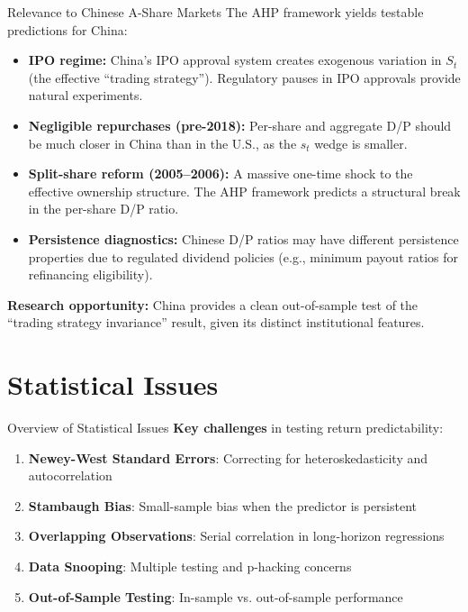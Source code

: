 \documentclass{beamer}
\begin{document}
\begin{frame}{Relevance to Chinese A-Share Markets}
	The AHP framework yields testable predictions for China:
	\begin{itemize}
		\item \textbf{IPO regime:} China's IPO approval system creates exogenous variation in $S_t$ (the effective ``trading strategy''). Regulatory pauses in IPO approvals provide natural experiments.
		\item \textbf{Negligible repurchases (pre-2018):} Per-share and aggregate D/P should be much closer in China than in the U.S., as the $s_t$ wedge is smaller.
		\item \textbf{Split-share reform (2005--2006):} A massive one-time shock to the effective ownership structure. The AHP framework predicts a structural break in the per-share D/P ratio.
		\item \textbf{Persistence diagnostics:} Chinese D/P ratios may have different persistence properties due to regulated dividend policies (e.g., minimum payout ratios for refinancing eligibility).
	\end{itemize}
	
	\vspace{5pt}
	\textbf{Research opportunity:} China provides a clean out-of-sample test of the ``trading strategy invariance'' result, given its distinct institutional features.
\end{frame}

\section{Statistical Issues}

\begin{frame}{Overview of Statistical Issues}
	\textbf{Key challenges} in testing return predictability:
	\begin{enumerate}
		\item \textbf{Newey-West Standard Errors}: Correcting for heteroskedasticity and autocorrelation
		\item \textbf{Stambaugh Bias}: Small-sample bias when the predictor is persistent
		\item \textbf{Overlapping Observations}: Serial correlation in long-horizon regressions
		\item \textbf{Data Snooping}: Multiple testing and p-hacking concerns
		\item \textbf{Out-of-Sample Testing}: In-sample vs. out-of-sample performance
	\end{enumerate}
\end{frame}
\end{document}
